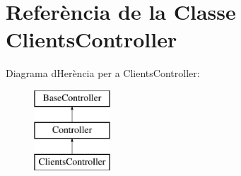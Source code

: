 \hypertarget{class_app_1_1_http_1_1_controllers_1_1_clients_controller}{}\section{Referència de la Classe Clients\+Controller}
\label{class_app_1_1_http_1_1_controllers_1_1_clients_controller}
Diagrama d\textquotesingle{}Herència per a Clients\+Controller\+:\begin{figure}[H]
\begin{center}
\leavevmode
\includegraphics[height=3.000000cm]{class_app_1_1_http_1_1_controllers_1_1_clients_controller}
\end{center}
\end{figure}
